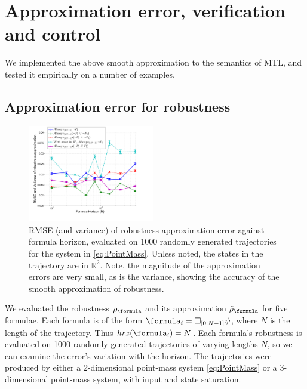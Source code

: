 \section{Approximation error, verification and control}
\label{sec:examples}
We implemented the above smooth approximation to the semantics of MTL, and tested it empirically on a number of examples.

\subsection{Approximation error for robustness}
\label{sec: ex apx error}
\begin{figure}[t]
\centering
\includegraphics[width=0.49\textwidth]{figures/RobustnessError}
\caption{{\small RMSE (and variance) of robustness approximation error against formula horizon, evaluated on 1000 randomly generated trajectories for the system in \eqref{eq:PointMass}. Unless noted, the states in the trajectory are in $\mathbb{R}^2$. Note, the magnitude of the approximation errors are very small, as is the variance, showing the accuracy of the smooth approximation of robustness.}}
\vspace{-20pt}
\label{fig:sample result}
\end{figure}

We evaluated the robustness $\robf$ and its approximation $\srobf$ for five formulae.
Each formula is of the form $\formula_i = \always_{[0:N-1]} \psi$, where $N$ is the length of the trajectory.
Thus $hrz(\formula_i)  = N$.
Each formula's robustness is evaluated on 1000 randomly-generated trajectories of varying lengths $N$, so we can  examine the error's variation with the horizon.
The trajectories were produced by either a 2-dimensional point-mass system \eqref{eq:PointMass} or a 3-dimensional point-mass system, with input and state saturation.

